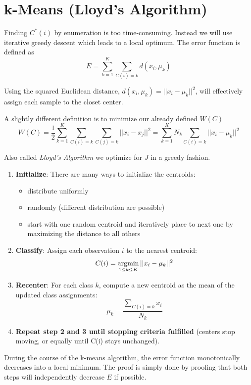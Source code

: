 \section{k-Means (Lloyd's Algorithm)}
Finding $C^*(i)$ by enumeration is too time-consuming. Instead we will use iterative greedy descent which leads to a local optimum.
The error function is defined as
\begin{equation}
E = \sum_{k=1}^K \sum_{C(i)=k} d(x_i, \mu_k)
\end{equation}

Using the squared Euclidean distance, $d(x_i, \mu_k) = ||x_i - \mu_k||^2$, will effectively assign each sample to the closet center.

A slightly different definition is to minimize our already defined $W(C)$
\begin{equation}
W(C) = \frac{1}{2} \sum\limits_{k=1}^K \sum\limits_{C(i)=k} \sum\limits_{C(j)=k} ||x_i - x_j||^2 = \sum\limits_{k=1}^K N_k \sum\limits_{C(i)=k} ||x_i - \mu_k||^2
\end{equation}

Also called \emph{Lloyd's Algorithm} we optimize for $J$ in a greedy fashion.
\begin{enumerate}
\item \textbf{Initialize}: There are many ways to initialize the centroids:
	\begin{itemize}
	\item distribute uniformly
	\item randomly (different distribution are possible)
	\item start with one random centroid and iteratively place to next one by maximizing the distance to all others
	\end{itemize}
\item \textbf{Classify}: Assign each observation $i$ to the nearest centroid: $$C(i) = \argmin\limits_{1\leq k \leq K} ||x_i - \mu_k||^2$$
\item \textbf{Recenter}: For each class $k$, compute a new centroid as the mean of the updated class assignments: $$\mu_k = \frac{\sum\limits_{C(i)=k} x_i}{N_k}$$
\item \textbf{Repeat step 2 and 3 until stopping criteria fulfilled} (\eg centers stop moving, or equally until C(i) stays unchanged).
\end{enumerate}

During the course of the k-means algorithm, the error function monotonically decreases into a local minimum. The proof is simply done by proofing that both steps will independently decrease $E$ if possible.

